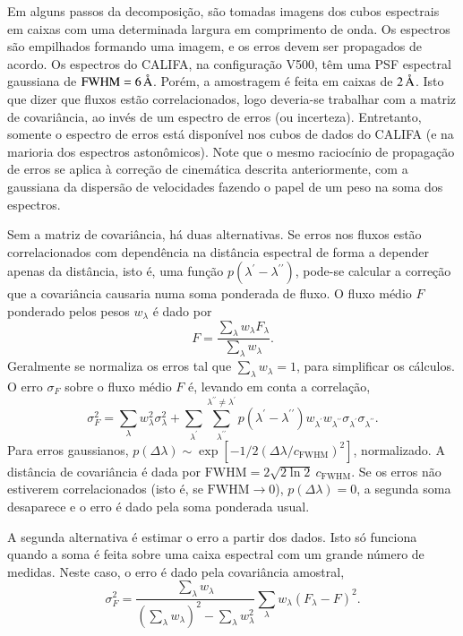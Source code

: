 Em alguns passos da decomposição, são tomadas imagens dos cubos espectrais em
caixas com uma determinada largura em comprimento de onda. Os espectros são
empilhados formando uma imagem, e os erros devem ser propagados de acordo. Os
espectros do CALIFA, na configuração V500, têm uma PSF espectral gaussiana de
$\mathrm{FWHM}=6\,\text{\normalfont\AA}$. Porém, a amostragem é feita em caixas de
$2\,\text{\normalfont\AA}$. Isto que dizer que fluxos estão correlacionados, logo deveria-se
trabalhar com a matriz de covariância, ao invés de um espectro de erros (ou
incerteza). Entretanto, somente o espectro de erros está disponível nos cubos de
dados do CALIFA (e na marioria dos espectros astonômicos). Note que o mesmo
raciocínio de propagação de erros se aplica à correção de cinemática descrita
anteriormente, com a gaussiana da dispersão de velocidades fazendo o papel de um
peso na soma dos espectros.

Sem a matriz de covariância, há duas alternativas. Se erros nos fluxos estão
correlacionados com dependência na distância espectral de forma a depender
apenas da distância, isto é, uma função $p(\lambda^\prime -
\lambda^{\prime\prime})$, pode-se calcular a correção que a covariância causaria
numa soma ponderada de fluxo. O fluxo médio $F$ ponderado pelos pesos
$w_\lambda$ é dado por
\begin{equation*}
F = \frac{\sum\limits_\lambda w_\lambda F_\lambda}{\sum\limits_\lambda
w_\lambda}.
\end{equation*}
Geralmente se normaliza os erros tal que $\sum\limits_\lambda
w_\lambda = 1$, para simplificar os cálculos. O erro $\sigma_F$ sobre o fluxo
médio $F$ é, levando em conta a correlação,
\begin{equation*}
\sigma_F^2 = \sum\limits_\lambda w_\lambda^2 \sigma_\lambda^2 +
\sum\limits_{\lambda^\prime}
\sum\limits_{\lambda^{\prime\prime}}^{\lambda^{\prime\prime} \neq
\lambda^\prime} p(\lambda^\prime - \lambda^{\prime\prime}) w_{\lambda^\prime}
w_{\lambda^{\prime\prime}} \sigma_{\lambda^\prime}
\sigma_{\lambda^{\prime\prime}}.
\end{equation*}
Para erros gaussianos, $p(\Delta \lambda) \sim \exp\left[-1/2
(\Delta\lambda / c_\mathrm{FWHM})^2\right]$, normalizado. A distância de
covariância é dada por $\mathrm{FWHM} = 2 \sqrt{2 \ln 2}\ c_\mathrm{FWHM}$. Se
os erros não estiverem correlacionados (isto é, se $\mathrm{FWHM} \to 0$),
$p(\Delta \lambda) = 0$, a segunda soma desaparece e o erro é dado pela soma
ponderada usual.

A segunda alternativa é estimar o erro a partir dos dados. Isto só funciona
quando a soma é feita sobre uma caixa espectral com um grande número de medidas.
Neste caso, o erro é dado pela covariância amostral,
\begin{equation*}
\sigma_F^2 = \dfrac{\sum\limits_\lambda w_\lambda}{\left(\sum\limits_\lambda
w_\lambda\right)^2 - \sum\limits_\lambda w_\lambda^2} \sum\limits_\lambda
w_\lambda \left(F_\lambda - F\right)^2.
\end{equation*}


